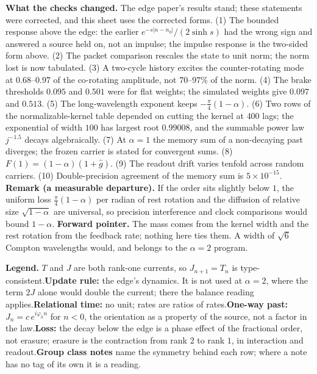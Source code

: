 \documentclass[10pt]{article}
\newcommand{\gh}{\hat g}
\begin{document}
\vspace{1pt}
\begin{smallbox}
\textbf{What the checks changed.} The edge paper's results stand; these statements were corrected, and this sheet uses the corrected forms. (1) The bounded response above the edge: the earlier $e^{-s|n-n_0|}/(2\sinh s)$ had the wrong sign and answered a source held on, not an impulse; the impulse response is the two-sided form above. (2) The packet comparison rescales the state to unit norm; the norm lost is now tabulated. (3) A two-cycle history excites the counter-rotating mode at $0.68$--$0.97$ of the co-rotating amplitude, not $70$--$97\%$ of the norm. (4) The brake thresholds $0.095$ and $0.501$ were for flat weights; the simulated weights give $0.097$ and $0.513$. (5) The long-wavelength exponent keeps $-\tfrac\pi4(1-\alpha)$. (6) Two rows of the normalizable-kernel table depended on cutting the kernel at $400$ lags; the exponential of width $100$ has largest root $0.99008$, and the summable power law $j^{-1.5}$ decays algebraically. (7) At $\alpha=1$ the memory sum of a non-decaying past diverges; the frozen carrier is stated for convergent sums. (8) $F(1)=(1-\alpha)(1+\gh)$. (9) The readout drift varies tenfold across random carriers. (10) Double-precision agreement of the memory sum is $5\times10^{-15}$. \textbf{Remark (a measurable departure).} If the order sits slightly below $1$, the uniform loss $\tfrac\pi4(1-\alpha)$ per radian of rest rotation and the diffusion of relative size $\sqrt{1-\alpha}$ are universal, so precision interference and clock comparisons would bound $1-\alpha$. \textbf{Forward pointer.} The mass comes from the kernel width and the rest rotation from the feedback rate; nothing here ties them. A width of $\sqrt6$ Compton wavelengths would, and belongs to the $\alpha=2$ program.
\end{smallbox}

\vspace{1pt}
\begin{smallbox}
\textbf{Legend.} $T$ and $J$ are both rank-one currents, so $J_{n+1}=T_n$ is type-consistent.\quad \textbf{Update rule:} the edge's dynamics. It is not used at $\alpha=2$, where the term $2J$ alone would double the current; there the balance reading applies.\quad \textbf{Relational time:} no unit; rates are ratios of rates.\quad \textbf{One-way past:} $J_n=c\,e^{i\varphi_hn}$ for $n<0$, the orientation as a property of the source, not a factor in the law.\quad \textbf{Loss:} the decay below the edge is a phase effect of the fractional order, not erasure; erasure is the contraction from rank $2$ to rank $1$, in interaction and readout.\quad \textbf{Group class notes} name the symmetry behind each row; where a note has no tag of its own it is a reading.
\end{smallbox}
\end{document}
